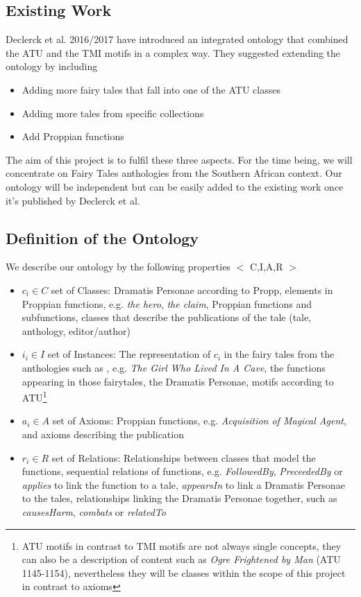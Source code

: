 \documentclass[10pt,a4paper]{article}
\begin{document}
	\subsection{Existing Work} 
	Declerck et al. 2016/2017 \cite{Declerck2017} have introduced an integrated ontology that combined the ATU and the TMI motifs in a complex way. They suggested extending the ontology by including 
	
	\begin{itemize}
		\item Adding more fairy tales that fall into one of the ATU classes
		\item Adding more tales from specific collections
		\item Add Proppian functions
		
	\end{itemize}	  
	
	The aim of this project is to fulfil these three aspects. For the time being, we will concentrate on Fairy Tales anthologies from the Southern African context. Our ontology will be independent but can be easily added to the existing work once it's published by Declerck et al.\cite{Declerck2017} 
	\subsection{Definition of the Ontology}
	We describe our ontology by the following properties $<$ C,I,A,R $>$

\begin{itemize}
	
	\item $c_{i} \in C $ set of Classes: Dramatis Personae according to Propp, elements in Proppian functions, e.g. \textit{the hero}, \textit{the claim}, Proppian functions and subfunctions, classes that describe the publications of the tale (tale, anthology, editor/author)       
	\item $i_{i} \in I $ set of Instances: The representation of $c_{i}$ in the fairy tales from the anthologies such as \cite{Smith1989}, e.g. \textit{The Girl Who Lived In A Cave}, the functions appearing in those fairytales, the Dramatis Personae,  motifs according to ATU\footnote{ATU motifs in contrast to TMI motifs are not always single concepts, they can also be a description of content such as \textit{Ogre Frightened by Man} (ATU 1145-1154), nevertheless they will be classes within the scope of this project in contrast to axioms} 
	\item $a_{i} \in A$  set of Axioms: Proppian functions, e.g. \textit{Acquisition of Magical Agent}, and axioms describing the publication 
	\item $r_{i} \in R $ set of Relations: Relationships between classes that model the functions, sequential relations of functions, e.g. \textit{FollowedBy}, \textit{PreceededBy} or \textit{applies} to link the function to a tale, \textit{appearsIn} to link a Dramatis Personae to the tales, relationships linking the Dramatis Personae together, such as \textit{causesHarm}, \textit{combats} or \textit{relatedTo}
	 
\end{itemize}
\end{document}
